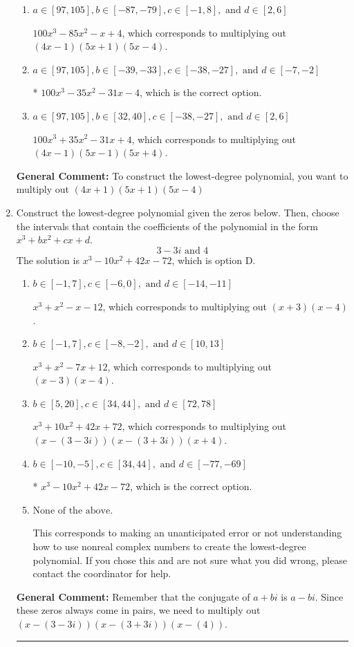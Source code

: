 \documentclass{extbook}[14pt]
\newcommand{\litem}[1]{\item #1

\rule{\textwidth}{0.4pt}}
\begin{document}
\begin{enumerate}
{\begin{enumerate}[label=\Alph*.]
$100x^{3} -125 x^{2} +41 x -4$, which corresponds to multiplying out $(4x -1)(5x -1)(5x -4)$.
\item \( a \in [97, 105], b \in [-87, -79], c \in [-1, 8], \text{ and } d \in [2, 6] \)

$100x^{3} -85 x^{2} -x + 4$, which corresponds to multiplying out $(4x -1)(5x + 1)(5x -4)$.
\item \( a \in [97, 105], b \in [-39, -33], c \in [-38, -27], \text{ and } d \in [-7, -2] \)

* $100x^{3} -35 x^{2} -31 x -4$, which is the correct option.
\item \( a \in [97, 105], b \in [32, 40], c \in [-38, -27], \text{ and } d \in [2, 6] \)

$100x^{3} +35 x^{2} -31 x + 4$, which corresponds to multiplying out $(4x -1)(5x -1)(5x + 4)$.
\end{enumerate}

\textbf{General Comment:} To construct the lowest-degree polynomial, you want to multiply out $(4x + 1)(5x + 1)(5x -4)$
}
\litem{
Construct the lowest-degree polynomial given the zeros below. Then, choose the intervals that contain the coefficients of the polynomial in the form $x^3+bx^2+cx+d$.
\[ 3 - 3 i \text{ and } 4 \]The solution is \( x^{3} -10 x^{2} +42 x -72 \), which is option D.\begin{enumerate}[label=\Alph*.]
\item \( b \in [-1, 7], c \in [-6, 0], \text{ and } d \in [-14, -11] \)

$x^{3} + x^{2} -x -12$, which corresponds to multiplying out $(x + 3)(x -4)$.
\item \( b \in [-1, 7], c \in [-8, -2], \text{ and } d \in [10, 13] \)

$x^{3} + x^{2} -7 x + 12$, which corresponds to multiplying out $(x -3)(x -4)$.
\item \( b \in [5, 20], c \in [34, 44], \text{ and } d \in [72, 78] \)

$x^{3} +10 x^{2} +42 x + 72$, which corresponds to multiplying out $(x-(3 - 3 i))(x-(3 + 3 i))(x + 4)$.
\item \( b \in [-10, -5], c \in [34, 44], \text{ and } d \in [-77, -69] \)

* $x^{3} -10 x^{2} +42 x -72$, which is the correct option.
\item \( \text{None of the above.} \)

This corresponds to making an unanticipated error or not understanding how to use nonreal complex numbers to create the lowest-degree polynomial. If you chose this and are not sure what you did wrong, please contact the coordinator for help.
\end{enumerate}

\textbf{General Comment:} Remember that the conjugate of $a+bi$ is $a-bi$. Since these zeros always come in pairs, we need to multiply out $(x-(3 - 3 i))(x-(3 + 3 i))(x-(4))$.
}
\end{enumerate}
\end{document}

